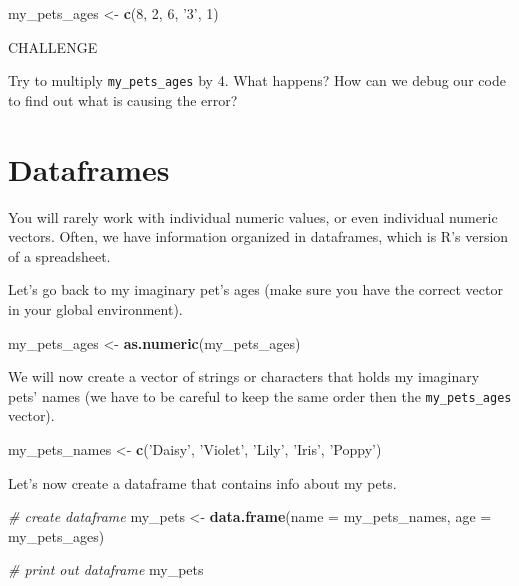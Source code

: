 \documentclass[]{book}
\newenvironment{Shaded}{\begin{snugshade}}{\end{snugshade}}
\newcommand{\CommentTok}[1]{\textcolor[rgb]{0.56,0.35,0.01}{\textit{#1}}}
\newcommand{\DataTypeTok}[1]{\textcolor[rgb]{0.13,0.29,0.53}{#1}}
\newcommand{\DecValTok}[1]{\textcolor[rgb]{0.00,0.00,0.81}{#1}}
\newcommand{\KeywordTok}[1]{\textcolor[rgb]{0.13,0.29,0.53}{\textbf{#1}}}
\newcommand{\NormalTok}[1]{#1}
\newcommand{\StringTok}[1]{\textcolor[rgb]{0.31,0.60,0.02}{#1}}
\begin{document}
\begin{Shaded}
\begin{Highlighting}[]
\NormalTok{my_pets_ages <-}\StringTok{ }\KeywordTok{c}\NormalTok{(}\DecValTok{8}\NormalTok{, }\DecValTok{2}\NormalTok{, }\DecValTok{6}\NormalTok{, }\StringTok{'3'}\NormalTok{, }\DecValTok{1}\NormalTok{)}
\end{Highlighting}
\end{Shaded}

\leavevmode\hypertarget{challenge}{}%
CHALLENGE

Try to multiply \texttt{my\_pets\_ages} by 4. What happens? How can we debug our code to find out what is causing the error?

\hypertarget{dataframes}{%
\section{Dataframes}\label{dataframes}}

You will rarely work with individual numeric values, or even individual numeric vectors. Often, we have information organized in dataframes, which is R's version of a spreadsheet.

Let's go back to my imaginary pet's ages (make sure you have the correct vector in your global environment).

\begin{Shaded}
\begin{Highlighting}[]
\NormalTok{my_pets_ages <-}\StringTok{ }\KeywordTok{as.numeric}\NormalTok{(my_pets_ages)}
\end{Highlighting}
\end{Shaded}

We will now create a vector of strings or characters that holds my imaginary pets' names (we have to be careful to keep the same order then the \texttt{my\_pets\_ages} vector).

\begin{Shaded}
\begin{Highlighting}[]
\NormalTok{my_pets_names <-}\StringTok{ }\KeywordTok{c}\NormalTok{(}\StringTok{'Daisy'}\NormalTok{, }\StringTok{'Violet'}\NormalTok{, }\StringTok{'Lily'}\NormalTok{, }\StringTok{'Iris'}\NormalTok{, }\StringTok{'Poppy'}\NormalTok{)}
\end{Highlighting}
\end{Shaded}

Let's now create a dataframe that contains info about my pets.

\begin{Shaded}
\begin{Highlighting}[]
\CommentTok{# create dataframe}
\NormalTok{my_pets <-}\StringTok{ }\KeywordTok{data.frame}\NormalTok{(}\DataTypeTok{name =}\NormalTok{ my_pets_names, }\DataTypeTok{age =}\NormalTok{ my_pets_ages)}

\CommentTok{# print out dataframe}
\NormalTok{my_pets}
\end{Highlighting}
\end{Shaded}
\end{document}
